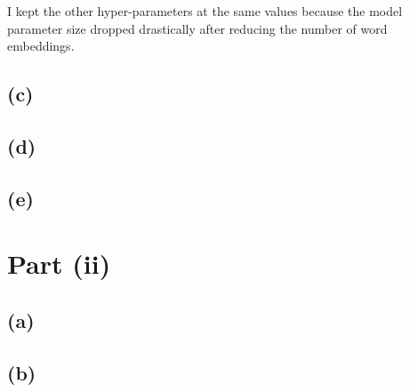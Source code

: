\documentclass{article}  %
\begin{document}
	I kept the other hyper-parameters at the same values because the model parameter size dropped drastically after reducing the number of word embeddings.
	
	\subsection*{(c)}
	
	\subsection*{(d)}
	
	
	\subsection*{(e)}
		
	\newpage
	
	\section*{Part (ii)}
	
	\subsection*{(a)}
	
	\subsection*{(b)}
	
\end{document}
